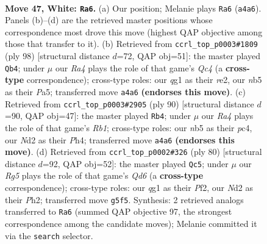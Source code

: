 \documentclass[11pt]{article}
\begin{document}
\clearpage

\begin{figure}[p]\centering
\begin{subfigure}{0.46\textwidth}\centering
\resizebox{\linewidth}{!}{%
\newchessgame
\chessboard[
  setfen={1r4k1/1r3pb1/2Q5/1n2p1R1/R3P3/3K4/3N2N1/6q1 w - - 4 47},
  showmover=false,
  pgfstyle=straightmove, color=movearrow, markmove={a4-a6}
]}
\caption{}
\end{subfigure}\hfill
\begin{subfigure}{0.46\textwidth}\centering
\resizebox{\linewidth}{!}{%
\newchessgame
\chessboard[
  setfen={8/4r1kp/q5p1/PR3p2/2Q5/5RP1/4rNK1/8 w - - 1 50},
  showmover=false,
  pgfstyle=straightmove, color=movearrow, markmove={c4-b4}
]}
\caption{}
\end{subfigure}
\\[4pt]
\begin{subfigure}{0.46\textwidth}\centering
\resizebox{\linewidth}{!}{%
\newchessgame
\chessboard[
  setfen={2kb2R1/p7/r7/3rpq2/2p1N2P/2P1Q3/5PK1/1R6 w - - 0 46},
  showmover=false,
  pgfstyle=straightmove, color=movearrow, markmove={b1-b4}
]}
\caption{}
\end{subfigure}\hfill
\begin{subfigure}{0.46\textwidth}\centering
\resizebox{\linewidth}{!}{%
\newchessgame
\chessboard[
  setfen={2R2rk1/5r1p/3Q4/P5p1/4p3/4nbN1/1q3P1P/2R3K1 w - - 0 41},
  showmover=false,
  pgfstyle=straightmove, color=movearrow, markmove={d6-c5}
]}
\caption{}
\end{subfigure}
\caption{\textbf{Move 47, White: \texttt{Ra6}.} (a) Our position; Melanie plays \texttt{Ra6} (\texttt{a4a6}). Panels (b)--(d) are the retrieved master positions whose correspondence most drove this move (highest QAP objective among those that transfer to it). (b) Retrieved from \texttt{ccrl\_top\_p0003\#1809} (ply 98) [structural distance $d$=72, QAP obj=51]: the master played \texttt{Qb4}; under $\mu$ our \emph{Ra4} plays the role of that game's \emph{Qc4} (a \textbf{cross-type} correspondence); cross-type roles: our \emph{q}g1 as their \emph{r}e2, our \emph{n}b5 as their \emph{P}a5; transferred move \texttt{a4a6} \textbf{(endorses this move)}. (c) Retrieved from \texttt{ccrl\_top\_p0003\#2905} (ply 90) [structural distance $d$=90, QAP obj=47]: the master played \texttt{Rb4}; under $\mu$ our \emph{Ra4} plays the role of that game's \emph{Rb1}; cross-type roles: our \emph{n}b5 as their \emph{p}c4, our \emph{N}d2 as their \emph{P}h4; transferred move \texttt{a4a6} \textbf{(endorses this move)}. (d) Retrieved from \texttt{ccrl\_top\_p0002\#326} (ply 80) [structural distance $d$=92, QAP obj=52]: the master played \texttt{Qc5}; under $\mu$ our \emph{Rg5} plays the role of that game's \emph{Qd6} (a \textbf{cross-type} correspondence); cross-type roles: our \emph{q}g1 as their \emph{P}f2, our \emph{N}d2 as their \emph{P}h2; transferred move \texttt{g5f5}. Synthesis: 2 retrieved analogs transferred to \texttt{Ra6} (summed QAP objective 97, the strongest correspondence among the candidate moves); Melanie committed it via the \texttt{search} selector.}
\label{fig:thought-m92}
\end{figure}
\end{document}

